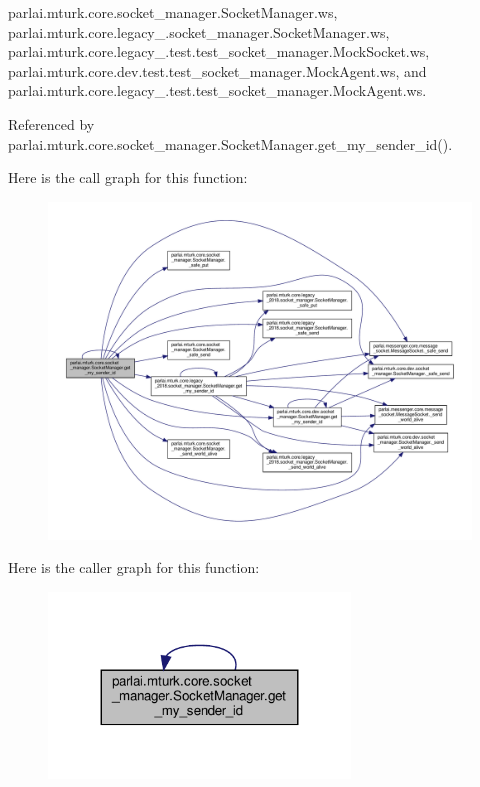 parlai.\+mturk.\+core.\+socket\+\_\+manager.\+Socket\+Manager.\+ws, parlai.\+mturk.\+core.\+legacy\+\_.\+socket\+\_\+manager.\+Socket\+Manager.\+ws, parlai.\+mturk.\+core.\+legacy\+\_.\+test.\+test\+\_\+socket\+\_\+manager.\+Mock\+Socket.\+ws, parlai.\+mturk.\+core.\+dev.\+test.\+test\+\_\+socket\+\_\+manager.\+Mock\+Agent.\+ws, and parlai.\+mturk.\+core.\+legacy\+\_.\+test.\+test\+\_\+socket\+\_\+manager.\+Mock\+Agent.\+ws.



Referenced by parlai.\+mturk.\+core.\+socket\+\_\+manager.\+Socket\+Manager.\+get\+\_\+my\+\_\+sender\+\_\+id().

Here is the call graph for this function\+:
\nopagebreak
\begin{figure}[H]
\begin{center}
\leavevmode
\includegraphics[width=350pt]{classparlai_1_1mturk_1_1core_1_1socket__manager_1_1SocketManager_a17a6ebab4a3c0e2882ba01398f2e9df1_cgraph}
\end{center}
\end{figure}
Here is the caller graph for this function\+:
\nopagebreak
\begin{figure}[H]
\begin{center}
\leavevmode
\includegraphics[width=227pt]{classparlai_1_1mturk_1_1core_1_1socket__manager_1_1SocketManager_a17a6ebab4a3c0e2882ba01398f2e9df1_icgraph}
\end{center}
\end{figure}
